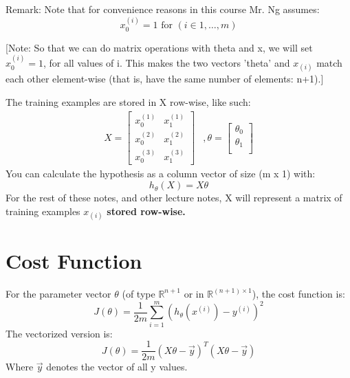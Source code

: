 Remark: Note that for convenience reasons in this course Mr. Ng assumes: $$ x_{0}^{(i)}  =1 \text{ for }  (i\in { 1,\dots, m } )$$

[Note: So that we can do matrix operations with theta and x, we will set $x^{(i)}_0 = 1$, for all values of i. This makes the two vectors 'theta' and $x_{(i)}$ match each other element-wise (that is, have the same number of elements: n+1).]

The training examples are stored in X row-wise, like such:
\begin{align*}
X = 
\begin{bmatrix}
x^{(1)}_0 & x^{(1)}_1  \\ x^{(2)}_0 & x^{(2)}_1  \\ x^{(3)}_0 & x^{(3)}_1 
\end{bmatrix}
&,\theta = 
\begin{bmatrix}
\theta_0 \\ 
\theta_1 \\ 
\end{bmatrix} 
\end{align*}
You can calculate the hypothesis as a column vector of size (m x 1) with:
\begin{equation}
h_\theta (X)=X\theta
\end{equation}
For the rest of these notes, and other lecture notes, X will represent a matrix of training examples $x_{(i)}$ {\bf stored row-wise.}
\section{Cost Function}
For the parameter vector $\theta$ (of type $\mathbb{R} ^{n+1}$ or in $\mathbb{R} ^{(n+1)\times 1}$), the cost function is:
\begin{equation}
J(\theta) = \frac{1}{2m} \sum_{i=1}^m \left(h_\theta (x^{(i)}) - y^{(i)} \right)^2
\end{equation}
The vectorized version is:
\begin{equation}
J(\theta) = \frac{1}{2m} (X\theta - \vec{y})^T (X\theta - \vec{y})
\end{equation}
Where $\vec{y}$ denotes the vector of all y values.
